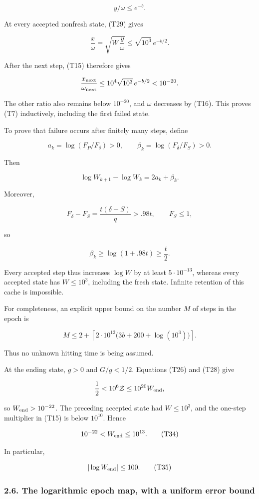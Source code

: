\[
y/\omega\le e^{-b}.
\]

At every accepted nonfresh state, (T29) gives

\[
\frac{x}{\omega}
=\sqrt{W\,\frac y\omega}
\le\sqrt{10^3}\,e^{-b/2}.
\]

After the next step, (T15) therefore gives

\[
\frac{x_{\rm next}}{\omega_{\rm next}}
\le10^4\sqrt{10^3}\,e^{-b/2}
<10^{-20}.
\]

The other ratio also remains below \(10^{-20}\), and \(\omega\) decreases by (T16). This proves (T7) inductively, including the first failed state.

To prove that failure occurs after finitely many steps, define

\[
a_k=\log(F_P/F_\delta)>0,
\qquad
\beta_k=\log(F_\delta/F_S)>0.
\]

Then

\[
\log W_{k+1}-\log W_k=2a_k+\beta_k.
\tag{T31}
\]

Moreover,

\[
F_\delta-F_S=\frac{t(\delta-S)}q>.98t,\qquad F_S\le1,
\]

so

\[
\beta_k\ge\log(1+.98t)\ge\frac t2.
\tag{T32}
\]

Every accepted step thus increases \(\log W\) by at least
\(5\cdot10^{-13}\), whereas every accepted state has \(W\le10^3\), including the fresh state. Infinite retention of this cache is impossible.

For completeness, an explicit upper bound on the number \(M\) of steps in the epoch is

\[
M\le
2+\left\lceil
2\cdot10^{12}\bigl(3b+200+\log(10^3)\bigr)
\right\rceil.
\tag{T33}
\]

Thus no unknown hitting time is being assumed.

At the ending state, \(g>0\) and \(G/g<1/2\). Equations (T26) and (T28) give

\[
\frac12<10^6\mathcal Z\le10^{20}W_{\rm end},
\]

so \(W_{\rm end}>10^{-22}\). The preceding accepted state had \(W\le10^3\), and the one-step multiplier in (T15) is below \(10^{10}\). Hence

\[
10^{-22}<W_{\rm end}\le10^{13}.
\tag{T34}
\]

In particular,

\[
|\log W_{\rm end}|\le100.
\tag{T35}
\]

\subsubsection{2.6. The logarithmic epoch map, with a uniform error bound}


